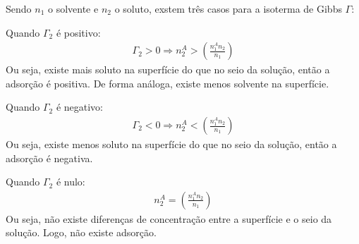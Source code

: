   Sendo $n_1$ o solvente e $n_2$ o soluto, exstem três casos para a isoterma de Gibbs $\Gamma$:
  \begin{corollary}
    Quando $\Gamma_2$ é positivo:
    \begin{gather}
      \Gamma_2 > 0 \Rightarrow n_2^A > \left( \frac{n_1^A n_2}{n_1} \right)
    \end{gather}
    Ou seja, existe mais soluto na superfície do que no seio da solução, então a adsorção é positiva. De forma análoga, existe menos solvente na superfície.

    Quando $\Gamma_2$ é negativo:
    \begin{gather}
      \Gamma_2 < 0 \Rightarrow n_2^A < \left( \frac{n_1^A n_2}{n_1} \right)
    \end{gather}
    Ou seja, existe menos soluto na superfície do que no seio da solução, então a adsorção é negativa.

    Quando $\Gamma_2$ é nulo:
    \begin{gather}
      n_2^A = \left( \frac{n_1^A n_2}{n_1} \right)
    \end{gather}
    Ou seja, não existe diferenças de concentração entre a superfície e o seio da solução. Logo, não existe adsorção.
  \end{corollary}